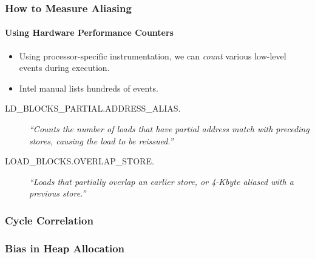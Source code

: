 \documentclass{beamer}
\begin{document}
\begin{frame}
  \frametitle{How to Measure Aliasing}
  \framesubtitle{Using Hardware Performance Counters}

  \begin{itemize}
    \item Using processor-specific instrumentation, we can \emph{count} various low-level events during execution.
    \item Intel manual lists hundreds of events.
  \end{itemize}

  \begin{description}
    \item[{\small LD\_BLOCKS\_PARTIAL.ADDRESS\_ALIAS.}] 
    \emph{``Counts the number of loads that have partial address match with preceding stores, causing the load to be reissued.''} 
    \cite[B.3.4.4]{OptimizationManual}
  \end{description}
  \begin{description}
    \item[{\small LOAD\_BLOCKS.OVERLAP\_STORE.}] 
    \emph{``Loads that partially overlap an earlier store, or 4-Kbyte aliased with a previous store.''} 
    \cite[Table 19-17]{Volume3B}
  \end{description}

\end{frame}


  \begin{frame}
    \frametitle{Cycle Correlation}


  \end{frame}


  \begin{frame}
    \frametitle{Bias in Heap Allocation}




  \end{frame}
\end{document}
